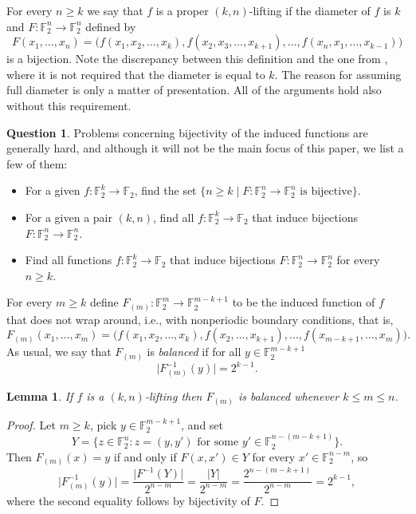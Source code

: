 \documentclass[11pt,english,a4paper]{amsart}
\theoremstyle{plain}
\newtheorem{lemma}[theorem]{Lemma}
\theoremstyle{definition}
\newtheorem{question}[theorem]{Question}
\theoremstyle{remark}
\newcommand{\F}{\mathbb{F}}
\begin{document}
	For every $n\geq k$ we say that $f$ is a proper $(k,n)$-lifting if the diameter of $f$ is $k$ and $F\colon \F_2^n\to\F_2^n$ defined by
	\[
	F(x_1,\dotsc,x_n)= \Big( f(x_1,x_2,\dotsc,x_k),
	f(x_2,x_3,\dotsc,x_{k+1}),\dotsc,
	f(x_n,x_1,\dotsc, x_{k-1}) \Big)
	\]
	is a bijection. Note the discrepancy between this definition and the one from \cite{OS-iacr}, where it is not required that the diameter is equal to $k$. The reason for assuming full diameter is only a matter of presentation. All of the arguments hold also without this requirement.

	\begin{question}
		Problems concerning bijectivity of the induced functions are generally hard, and although it will not be the main focus of this paper, we list a few of them:
  \begin{itemize}
	\item[(i)] For a given $f\colon\F_2^k\to\F_2$, find the set $\{n\geq k \mid F\colon\F_2^n\to\F_2^n \text{ is bijective} \}$.
	\item[(ii)] For a given a pair $(k,n)$, find all $f\colon\F_2^k\to\F_2$ that induce bijections $F\colon\F_2^n\to\F_2^n$.
	\item[(iii)] Find all functions $f\colon\F_2^k\to\F_2$ that induce bijections $F\colon\F_2^n\to\F_2^n$ for every $n\geq k$.
 \end{itemize}
\end{question}
 
	For every $m\geq k$ define $F_{(m)}\colon\F_2^m\to\F_2^{m-k+1}$ to be the induced function of $f$ that does not wrap around, i.e., with nonperiodic boundary conditions, that is,
	\[
	F_{(m)}(x_1,\dotsc,x_m)= \Big( f(x_1,x_2,\dotsc,x_k),
	f(x_2,\dotsc,x_{k+1}),\dotsc,
	f(x_{m-k+1},\dotsc, x_m) \Big).
	\]
	As usual, we say that $F_{(m)}$ is \emph{balanced} if for all $y\in\F_2^{m-k+1}$
	\[
	\lvert F_{(m)}^{-1}(y)\rvert = 2^{k-1}.
	\]
	
	\begin{lemma}\label{uniform-distribution}
		If $f$ is a $(k,n)$-lifting then $F_{(m)}$ is balanced whenever $k\leq m\leq n$.
	\end{lemma}
	
	\begin{proof}
		Let $m\geq k$, pick $y\in\F_2^{m-k+1}$, and set
		\[
		Y=\{ z\in\F_2^n : z=(y,y') \text{ for some } y'\in\F_2^{n-(m-k+1)} \}.
		\]
		Then $F_{(m)}(x)=y$ if and only if $F(x,x')\in Y$ for every $x'\in\F_2^{n-m}$, so
		\[
		\lvert F_{(m)}^{-1}(y)\rvert=\frac{\lvert F^{-1}(Y)\rvert}{2^{n-m}}=\frac{\lvert Y\rvert}{2^{n-m}}=\frac{2^{n-(m-k+1)}}{2^{n-m}}=2^{k-1},
		\]
		where the second equality follows by bijectivity of $F$.
	\end{proof}
	
\end{document}
